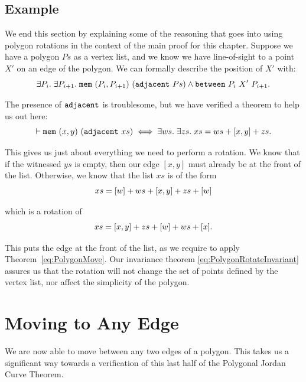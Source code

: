 \subsection{Example}
We end this section by explaining some of the reasoning that goes into using polygon rotations in the context of the main proof for this chapter. Suppose we have a polygon $Ps$ as a vertex list, and we know we have line-of-sight to a point $X'$ on an edge of the polygon. We can formally describe the position of $X'$ with:
\begin{displaymath}
  \exists P_i.\;\exists P_{i+1}.\; \texttt{mem}\ (P_i,P_{i+1})\ (\texttt{adjacent}\ Ps) \wedge \texttt{between}\ P_i\ X'\ P_{i+1}.
\end{displaymath}

The presence of $\texttt{adjacent}$ is troublesome, but we have verified a theorem to help us out here:
\begin{equation*}
\vdash  \texttt{mem}\ (x,y)\ (\texttt{adjacent}\ xs) \iff 
\exists ws.\;\exists zs.\; xs = ws + [x,y] + zs.
\end{equation*}

This gives us just about everything we need to perform a rotation. We know that if the witnessed $ys$ is empty, then our edge $[x,y]$ must already be at the front of the list. Otherwise, we know that the list $xs$ is of the form
\begin{displaymath}
  xs = [w] + ws + [x,y] + zs + [w]
\end{displaymath}

which is a rotation of
\begin{displaymath}
  xs = [x,y] + zs + [w] + ws + [x].
\end{displaymath}

This puts the edge at the front of the list, as we require to apply Theorem~\ref{eq:PolygonMove}. Our invariance theorem \eqref{eq:PolygonRotateInvariant} assures us that the rotation will not change the set of points defined by the vertex list, nor affect the simplicity of the polygon.

\section{Moving to Any Edge}
We are now able to move between any two edges of a polygon. This takes us a significant way towards a verification of this last half of the Polygonal Jordan Curve Theorem. 


